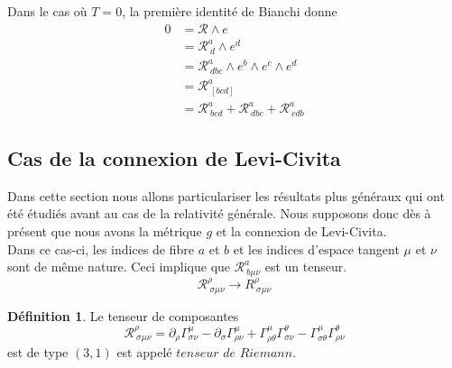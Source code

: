 \documentclass[a4paper,11pt]{report}
\theoremstyle{definition}
\theoremstyle{plain}
\theoremstyle{definition}
\newtheorem{defn}{Définition}[chapter]
\theoremstyle{remark}
\newcommand{\p}{\partial}
\begin{document}
                Dans le cas où $T = 0$, la première identité de Bianchi donne
                \begin{align}
                    0 &= \mathscr{R}\wedge e\\
                    &= \mathscr{R}^a_{~d}\wedge e^d\\
                    &= \mathscr{R}^a_{~dbc}\wedge e^b\wedge e^c\wedge e^d \\
                    &= \mathscr{R}^a_{~[bcd]}\\
                    &= \mathscr{R}^a_{~bcd}+\mathscr{R}^a_{~dbc}+\mathscr{R}^a_{~cdb}\label{eq:idbianchi}
                \end{align}
                
            \subsection{Cas de la connexion de Levi-Civita}
                        
                Dans cette section nous allons particulariser les résultats plus généraux qui ont été étudiés avant au cas de la relativité générale. Nous supposons donc dès à présent que nous avons la métrique $g$ et la connexion de Levi-Civita. \\
                
                Dans ce cas-ci, les indices de fibre $a$ et $b$ et les indices d'espace tangent $\mu$ et $\nu$ sont de même nature. Ceci implique que $\mathscr{R}^a_{~b\mu\nu}$ est un tenseur.
                \begin{equation*}
                    \mathscr{R}^\rho_{~\sigma\mu\nu}\to R^\rho_{~\sigma\mu\nu}
                \end{equation*}
                
                \begin{defn}
                    Le tenseur de composantes 
                    \begin{equation}
                        \mathscr{R}^\rho_{~\sigma\mu\nu} = \p_\rho\Gamma^\mu_{\sigma \nu}-\p_\sigma\Gamma^\mu_{\rho\nu} + \Gamma^\mu_{\rho \theta}\Gamma^\theta_{\sigma\nu}-\Gamma^\mu_{\sigma \theta}\Gamma^\theta_{\rho\nu}
                    \end{equation}
                    est de type $(3,1)$ est appelé $\textit{tenseur de Riemann}$.
                \end{defn}
                
\end{document}
